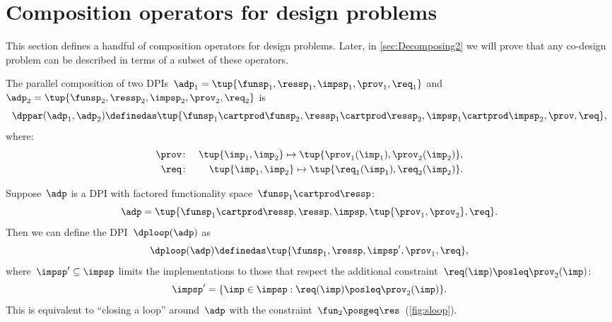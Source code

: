 
\section{Composition operators for design problems}

This section defines a handful of composition operators for design
problems.
Later, in \cref{sec:Decomposing2} we will prove that any co-design
problem can be described in terms of a subset of these operators.

\label{sec:threeoperators}

\begin{definition}[$\dppar$]
    \label{def:parallel}
    The parallel composition of two DPIs~$\adp_{1}=\tup{\funsp_{1},\ressp_{1},\impsp_{1},\prov_{1},\req_{1}}$
    and~$\adp_{2}=\tup{\funsp_{2},\ressp_{2},\impsp_{2},\prov_{2},
            \req_{2}}$ is
    \begin{equation*}
        \dppar(\adp_{1},\adp_{2})\definedas\tup{\funsp_{1}\cartprod\funsp_{2},\ressp_{1}\cartprod\ressp_{2},\impsp_{1}\cartprod\impsp_{2},\prov,\req} ,
    \end{equation*}
    where:
    \begin{eqnarray}
        \prov & \colon & \tup{ \imp_{1},\imp_{2}} \mapsto \tup{\prov_{1}(\imp_{1}),\prov_{2}(\imp_{2})} ,\label{eq:dppar-exec} \\
        \req  & \colon & \tup{ \imp_{1},\imp_{2}}\mapsto\tup{\req_{1}(\imp_{1}),\req_{2}(\imp_{2})} .\nonumber
    \end{eqnarray}

\end{definition}

\begin{definition}[$\dploop$]
    \label{def:dp_loop}Suppose~$\adp$ is a DPI with factored functionality
    space~$\funsp_{1}\cartprod\ressp$:
    \begin{equation*}
        \adp=\tup{ \funsp_{1}\cartprod\ressp,\ressp,\impsp,\tup{ \prov_{1},\prov_{2}} ,\req}.
    \end{equation*}
    Then we can define the DPI~$\dploop(\adp)$ as
    \begin{equation*}
        \dploop(\adp)\definedas\tup{ \funsp_{1},\ressp,\impsp',\prov_{1},\req} ,
    \end{equation*}
    where~$\impsp'\subseteq\impsp$ limits the implementations to those
    that respect the additional constraint~$\req(\imp)\posleq\prov_{2}(\imp)$:
    \begin{equation*}
        \impsp'=\{\imp\in\impsp:\req(\imp)\posleq\prov_{2}(\imp)\}.
    \end{equation*}
    This is equivalent to ``closing a loop'' around~$\adp$ with
    the constraint~$\fun_{2}\posgeq\res$~(\cref{fig:sloop}).
\end{definition}

